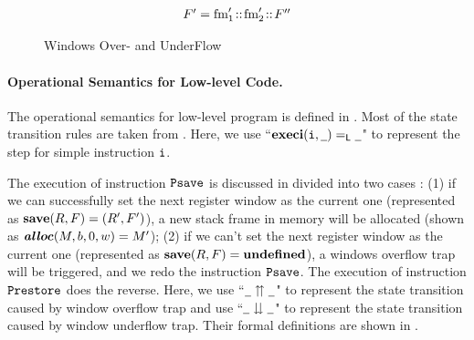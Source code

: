 \begin{figure}[!t]
\[\begin{array}{c}
{\begin{array}{c}
                    F' = \text{fm}_1' \!::\!\text{fm}_2' \!::\!F'' 
				\end{array}
			}
		\end{array}
    \]
    \caption{Windows Over- and UnderFlow}
    \label{fig:Windows Over- and UnderFlow}
    \vspace{-0.5em}
\end{figure}

\paragraph{\bf Operational Semantics for Low-level Code.} 
The operational semantics for low-level program is defined in 
\Fig{\ref{fig:selected-opsem-low-level-program}}. Most of the 
state transition rules are taken from 
\Fig{\ref{Selected Operational Semantics}}. Here, we use 
``$\textbf{execi}{{(\texttt{i}{}, \underline{\ \,})}} =_{\textsf{L}} {\underline{\ \,}}$" to represent 
the step for simple instruction $\texttt{i}{}$.

The execution of instruction $\texttt{Psave}$ is discussed in divided 
into two cases : (1) if we can successfully set the next register 
window as the current one (represented as 
$\textbf{save}{(R, F)} = (R', F')$),   
a new stack frame in memory will be allocated
(shown as $\textbf{\textit{alloc}}(M, b, 0, w) = M'$); 
(2) if we can't set the next register window as the current 
one (represented as $\textbf{save}{(R, F)} = \textbf{undefined}$), 
a windows overflow trap will be triggered, and we redo the 
instruction $\texttt{Psave}$. The execution of instruction $\texttt{Prestore}$ 
does the reverse. Here, we use ``${\underline{\ \,}} \upuparrows {\underline{\ \,}}$" 
to represent the state transition caused by window overflow trap and 
use ``${\underline{\ \,}} \downdownarrows {\underline{\ \,}}$" to represent the state 
transition caused by window underflow trap. Their formal definitions 
are shown in \Fig{\ref{fig:Windows Over- and UnderFlow}}. 